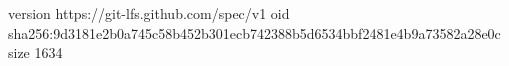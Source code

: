 version https://git-lfs.github.com/spec/v1
oid sha256:9d3181e2b0a745c58b452b301ecb742388b5d6534bbf2481e4b9a73582a28e0c
size 1634
